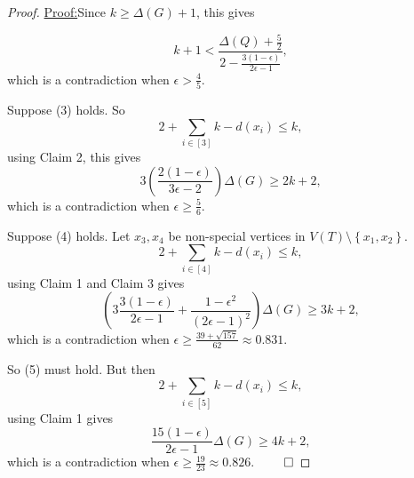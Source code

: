 \documentclass[12pt]{amsart}
\theoremstyle{plain}
\theoremstyle{definition}
\theoremstyle{remark}
\newcommand{\set}[1]{\left\{ #1 \right\}}
\newcommand{\irange}[1]{\left[#1\right]}
\newcommand{\parens}[1]{\left( #1 \right)}
\newenvironment{claimproof}[1]{\par\noindent\underline{Proof:}\space#1}{\leavevmode\unskip\penalty9999
\hbox{}\nobreak\hfill\quad\hbox{$\qed$}}
\begin{document}
\begin{proof}
\begin{claimproof}
Since $k \ge \Delta(G) + 1$, this gives

\[k + 1 < \frac{\Delta(Q) + \frac52}{2 - \frac{3(1-\epsilon)}{2\epsilon -1}},\]
which is a contradiction when $\epsilon > \frac45$.

Suppose (3) holds.  So
\[2 + \sum_{i \in \irange{3}} k - d(x_i) \le k,\]
using Claim 2, this gives
\[3\parens{\frac{2(1-\epsilon)}{3\epsilon - 2}}\Delta(G) \ge 2k+2,\]
which is a contradiction when $\epsilon \ge \frac56$.

Suppose (4) holds.  Let $x_3,x_4$ be non-special vertices in $V(T) \setminus \set{x_1,x_2}$.
\[2 + \sum_{i \in \irange{4}} k - d(x_i) \le k,\]
using Claim 1 and Claim 3 gives
\[\parens{3\frac{3(1-\epsilon)}{2\epsilon -1} + \frac{1 - \epsilon^2}{\parens{2\epsilon - 1}^2}}\Delta(G) \ge 3k+2,\]
which is a contradiction when $\epsilon \ge \frac{39 + \sqrt{157}}{62} \approx 0.831$.

So (5) must hold.  But then
\[2 + \sum_{i \in \irange{5}} k - d(x_i) \le k,\]
using Claim 1 gives
\[\frac{15(1-\epsilon)}{2\epsilon -1}\Delta(G) \ge 4k+2,\]
which is a contradiction when $\epsilon \ge \frac{19}{23} \approx 0.826$.
\end{claimproof}

\end{proof}

\newpage
\end{document}
